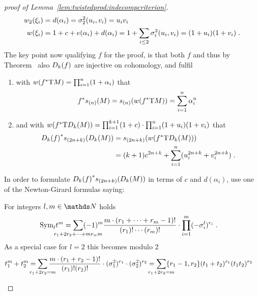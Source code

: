 \begin{proof}[proof of Lemma~\ref{lem:twistedprod:indecompcriterion}]
\begin{align*}
    {w_{2}}(\xi_i) &= d(\alpha_i)   = \sigma_{2}^{2}(u_i, v_i) = u_iv_i \\
    {w}(\xi_i)  &= 1+c+e(\alpha_i)+d(\alpha_i)
                 = 1+\sum_{i\leq2}\sigma_{i}^{2}(u_i,v_i) = (1+u_i)(1+v_i)
                 \;.
  \end{align*}
  The key point now qualifying $f$ for the proof, is that both $f$ and
  thus by
  Theorem~
  also $D_{k}({f})$ are injective on cohomology, and fulfil
  \begin{enumerate}
  \item with ${w}({f}^*\mathrm{T}M) = \prod_{i=1}^n (1+\alpha_i)$ that
    \begin{gather}\label{eq:lem:twistedprod:indecompcriterion:sM}
      {f}^* s_{(n)}(M)
      = s_{(n)}({w}({f}^*\mathrm{T}M))
      = \sum_{i=1}^n \alpha_i^n
      \;
    \end{gather}
  \item and with
    ${w}({f}^*\mathrm{T}D_{k}({M}))
    = \prod_{i=1}^{k+1}(1+c) \cdot \prod_{i=1}^n
    (1+u_i)(1+v_i)$
    that
    \begin{align}\notag
      {D_{k}({f})}^* s_{(2n+k)}(D_{k}({M}))
      &= s_{(2n+k)}({w}({f}^*\mathrm{T}D_{k}({M}))) \\
      \label{eq:lem:twistedprod:indecompcriterion:sDkM}
      &= (k+1)c^{2n+k} + \sum_{i=1}^n (u_i^{2n+k} + v_i^{2n+k})
        \;.
    \end{align}
  \end{enumerate}
  In order to formulate
  ${D_{k}({f})}^*s_{(2n+k)}(D_{k}({M}))$ 
  in terms of $c$ and $d(\alpha_i)$,
  use one of the Newton-Girard formulas saying:
  \begin{Lem}
    For integers $l, m\in\Nat$ holds
    \begin{align*}
      \symm{l} t^m
      &= \sum_{\mathclap{r_1+2r_2+\dotsb+mr_=m}}
        (-1)^m \frac{m\cdot(r_1+\dotsb+r_m-1)!}{(r_1)!\dotsm(r_m)!}
        \cdot \prod_{i=1}^m (-\el i l)^{r_i}
        \;.
    \end{align*}
    As a special case for $l=2$ this becomes modulo 2
    \begin{align*}
      t_1^m + t_2^m
      &= \sum_{\mathclap{r_1+2r_2=m}}
        \frac{m\cdot(r_1+r_2-1)!}{(r_1)!(r_2)!}
        \cdot (\el 1 2)^{r_1} \cdot (\el 2 2)^{r_2}
        = \sum_{\mathclap{r_1+2r_2=m}}
        \altbinom{r_1-1}{r_2} (t_1+t_2)^{r_1}(t_1t_2)^{r_2}
    \end{align*}

\end{Lem}
\end{proof}
